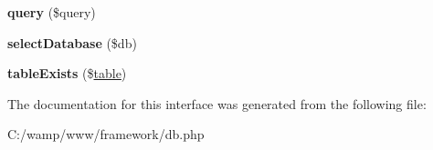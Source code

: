 \begin{DoxyCompactItemize}
\item 
\hypertarget{interfacedatabase_adapter_ac9fddec3f6bd1db128887a1b211d90f0}{
{\bfseries query} (\$query)}
\label{interfacedatabase_adapter_ac9fddec3f6bd1db128887a1b211d90f0}

\item 
\hypertarget{interfacedatabase_adapter_ab624b0b234f9db9dbc6dc4180f566b1f}{
{\bfseries selectDatabase} (\$db)}
\label{interfacedatabase_adapter_ab624b0b234f9db9dbc6dc4180f566b1f}

\item 
\hypertarget{interfacedatabase_adapter_ae7cdaa744d52a1eb0103e377023ca528}{
{\bfseries tableExists} (\$\hyperlink{classtable}{table})}
\label{interfacedatabase_adapter_ae7cdaa744d52a1eb0103e377023ca528}

\end{DoxyCompactItemize}


The documentation for this interface was generated from the following file:\begin{DoxyCompactItemize}
\item 
C:/wamp/www/framework/db.php\end{DoxyCompactItemize}
